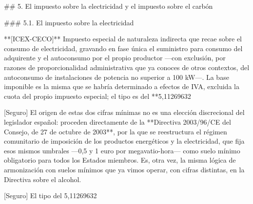 \documentclass[10pt,a4paper]{article}
\begin{document}
## 5. El impuesto sobre la electricidad y el impuesto sobre el carbón

### 5.1. El impuesto sobre la electricidad

**[ICEX-CECO]** Impuesto especial de naturaleza indirecta que recae sobre el consumo de electricidad, gravando en fase única el suministro para consumo del adquirente y el autoconsumo por el propio productor —con exclusión, por razones de proporcionalidad administrativa que ya conoces de otros contextos, del autoconsumo de instalaciones de potencia no superior a 100 kW—. La base imponible es la misma que se habría determinado a efectos de IVA, excluida la cuota del propio impuesto especial; el tipo es del **5,11269632%

[Seguro] El origen de estas dos cifras mínimas no es una elección discrecional del legislador español: proceden directamente de la **Directiva 2003/96/CE del Consejo, de 27 de octubre de 2003**, por la que se reestructura el régimen comunitario de imposición de los productos energéticos y la electricidad, que fija esos mismos umbrales —0,5 y 1 euro por megavatio-hora— como suelo mínimo obligatorio para todos los Estados miembros. Es, otra vez, la misma lógica de armonización con suelos mínimos que ya vimos operar, con cifras distintas, en la Directiva sobre el alcohol.

[Seguro] El tipo del 5,11269632%
\end{document}
